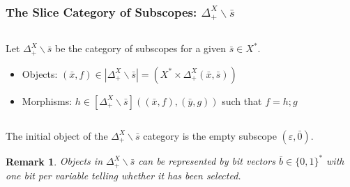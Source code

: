 \documentclass[aspectratio=169]{beamer}
\theoremstyle{remarkstyle}
\newtheorem*{remark}{Remark}
\begin{document}
\begin{frame}[fragile]
  \frametitle{The Slice Category of Subscopes: $Δ_+^X∖\bar{s}$}
  \begin{definition}
    \begin{columns}
      \begin{column}{0.68\textwidth}
        Let $Δ_+^X∖\bar{s}$ be the category of subscopes for a given $\bar{s} ∈ X^*$. 
        \begin{itemize}
          \item Objects: $(\bar{x}, f) ∈ |Δ_+^X∖\bar{s}| = \left( X^* × Δ_+^X(\bar{x}, \bar{s}) \right)$
          \item Morphisms: $h ∈ [Δ_+^X∖\bar{s}]((\bar{x}, f), (\bar{y}, g))$ such that $f = h;g$ 
        \end{itemize}
      \end{column}
      \begin{column}{0.3\textwidth}
      \end{column}
    \end{columns}
    
  \end{definition}
  \begin{corollary}
    The initial object of the $Δ_+^X∖\bar{s}$ category is the empty subscope $(ε, \bar{0})$. 
  \end{corollary}
  \begin{remark}
    Objects in $Δ_+^X∖\bar{s}$ can be represented by \emph{bit vectors} $\bar{b} ∈ \{0, 1\}^*$ with one bit per variable telling whether it has been selected.
  \end{remark}
\end{frame}
\end{document}
